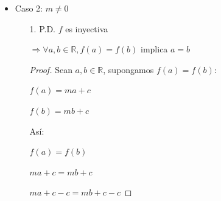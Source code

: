 \documentclass{article}
\begin{document}
\begin{enumerate}
\begin{enumerate}
\begin{itemize}
\begin{enumerate}
                \(\Rightarrow \lnot (\forall b \in \mathbb{R}, \exists a \in \mathbb{R} \text{ tal que } f(a) = b)\)

                \(\Rightarrow \exists b \in \mathbb{R} \text{ tal que } \forall a \in \mathbb{R}, f(a) \neq b\)
                \vspace{\baselineskip}
                \begin{proof}
                Sea \(b = c + 1\), P.D. \(\forall a\in\mathbb{R}\), \(f(a) \neq b\)

                Sea una \(a\in\mathbb{R}\):
                
                \(f(a)=c\)

                \(f(a) \neq c + 1\)
                
                \(\therefore f(a) \neq b\)

                Así, cuando \(m = 0\), \(f\) no es suprayectiva.
                
                \end{proof}
                \item[3.] Cuando \(m = 0\), \(f\) no es biyectiva porque no es ni suprayectiva ni intectiva.
                \item[4.] Cuando \(m = 0\), \(f\) no es biyectiva; por lo tanto, no tiene función inversa.
            \end{enumerate}
            \item Caso 2: \(m \neq 0\)
            \begin{enumerate}
                \item[1.] P.D. \(f\) es inyectiva
                
                \(\Rightarrow \forall a,b \in \mathbb{R}, f(a) = f(b)\) implica \(a = b\)
                
                \begin{proof} Sean \(a,b \in \mathbb{R}\), supongamos \(f(a) = f(b)\):
                
                \(f(a) = ma + c\)
                
                \(f(b) = mb + c\)
                \vspace{\baselineskip}

                Así:
                
                \(f(a) = f(b)\)
                
                \(ma + c = mb + c\)
                
                \(ma + c - c = mb + c - c\)
                

\end{proof}
\end{enumerate}
\end{itemize}
\end{enumerate}
\end{enumerate}
\end{document}

